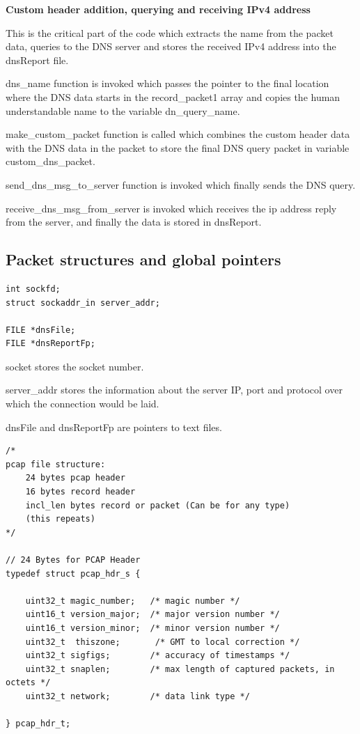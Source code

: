 \documentclass[12pt, a4paper]{report}
\begin{document}
\textbf{Custom header addition, querying and receiving IPv4 address}

This is the critical part of the code which extracts the name from the packet data, queries to the DNS server and stores the received IPv4 address into the dnsReport file.

dns\_name function is invoked which passes the pointer to the final location where the DNS data starts in the record\_packet1 array and copies the human understandable name to the variable dn\_query\_name.

make\_custom\_packet function is called which combines the custom header data with the DNS data in the packet to store the final DNS query packet in variable custom\_dns\_packet. 

send\_dns\_msg\_to\_server function is invoked which finally sends the DNS query.

receive\_dns\_msg\_from\_server is invoked which receives the ip address reply from the server, and finally the data is stored in dnsReport.

\newpage
\subsection{Packet structures and global pointers}


\begin{lstlisting}[caption={socket, server\_addr and file pointers}]
int sockfd;
struct sockaddr_in server_addr;

FILE *dnsFile;
FILE *dnsReportFp;

\end{lstlisting}

socket stores the socket number.

server\_addr stores the information about the server IP, port and protocol over which the connection would be laid.

dnsFile and dnsReportFp are pointers to text files.
\vspace{1em}
\begin{lstlisting}[caption={Pcap file structure and pcap file header}]
/*
pcap file structure:
    24 bytes pcap header 
    16 bytes record header
    incl_len bytes record or packet (Can be for any type)
    (this repeats)
*/

// 24 Bytes for PCAP Header
typedef struct pcap_hdr_s {
    
    uint32_t magic_number;   /* magic number */
    uint16_t version_major;  /* major version number */
    uint16_t version_minor;  /* minor version number */
    uint32_t  thiszone;       /* GMT to local correction */
    uint32_t sigfigs;        /* accuracy of timestamps */
    uint32_t snaplen;        /* max length of captured packets, in octets */
    uint32_t network;        /* data link type */

} pcap_hdr_t;

\end{lstlisting}
\end{document}
